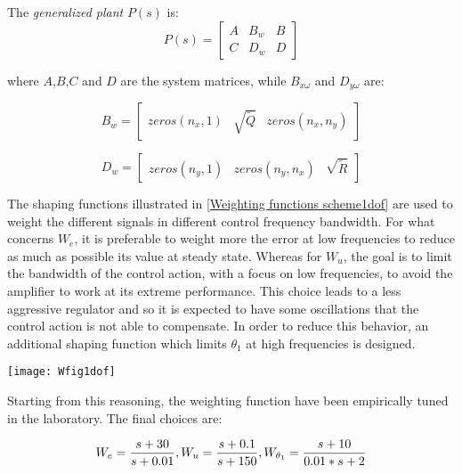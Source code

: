 The \textit{generalized plant} $P(s)$ is:
\begin{equation}
	P(s)
	=
	\left[
	\begin{array}{c|cc}
		A & B_{w} & B \\
		\hline
		C & D_{w} & D	
	\end{array}
	\right]
\label{P(s)}
\end{equation}

where $A$,$B$,$C$ and $D$ are the system matrices, while $B_{\dot{x}\omega}$ and $D_{y\omega}$ are:

\begin{equation}
	B_{w}=
	\begin{bmatrix}
		zeros(n_x,1) & \sqrt{\tilde{Q}} & zeros (n_x,n_y)
	\end{bmatrix}
\end{equation}

\begin{equation}
	D_{w}=
	\begin{bmatrix}
		zeros(n_y,1) & zeros (n_y,n_x) & \sqrt{\tilde{R}}
	\end{bmatrix}
\end{equation}

The shaping functions illustrated in \ref{Weighting functions scheme1dof} are used to weight the different signals in different control frequency bandwidth. 
For what concerns $W_e$, it is preferable to weight more the error at low frequencies to reduce as much as possible its value at steady state. Whereas for $W_u$, the goal is to limit the bandwidth of the control action, with a focus on low frequencies, to avoid the amplifier to  work at its extreme performance. This choice leads to a less aggressive regulator and so it is expected to have some oscillations that the control action is not able to compensate. In order to reduce this behavior, an additional shaping function which limits $\theta_{1}$ at high frequencies is designed.

\begin{figure*}[h]
	\centering
	\texttt{[image: Wfig1dof]}
	\caption{Weighting functions scheme}
	\label{Weighting functions scheme1dof}
\end{figure*}
Starting from this reasoning, the weighting function have been empirically tuned in the laboratory. The final choices are:

\begin{equation}
	W_e=
	\frac{s+30}{s+0.01}
	\\
	,
	\\
	W_u=
	\frac{s+0.1}{s+150}
	\\
	,
	\\
	W_{\theta_{1}}=
	\frac{s+10}{0.01*s+2}
\end{equation}

